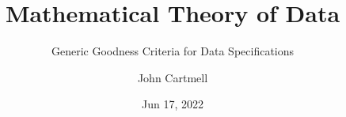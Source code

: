 

\usepackage{mathptmx}
\usepackage{amsfonts}
\usepackage{wasysym}
\usepackage{url}
\usepackage{hyperref}


\newcommand{\sharedmacros}{../../SharedMacros}










\renewcommand{\erpictureFolder}[0]{../../SharedPictures}
\setcounter{equation}{0}





\title[John Cartmell]{Mathematical Theory of Data}
\subtitle{Generic Goodness Criteria for Data Specifications}
\author{John Cartmell}
\date{Jun 17, 2022}

\usepackage{framed}
\usepackage{bibentry}
\usepackage{colortbl}
\usepackage{ulem}   %
\usepackage{listings}
\usepackage{arydshln} %
\usepackage{pst-arrow} %




\newcommand{\slidecontext}{Introduction} %

\newcommand{\comingnext}[1]{
\begin{frame}{COMING NEXT}
\begin{center}
\Large #1
\end{center}
\end{frame}
}


\begin{frame}
\titlepage
\end{frame}

